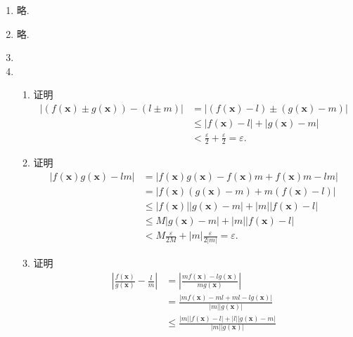 \documentclass[a4paper, 11pt]{ctexart}
\begin{document}
    \begin{enumerate}
        \item %
            略.
        \item %
            略.
        \item %
        \item %
            \begin{enumerate}[(1)]
                \item %
                    {\heiti 证明}\quad \begin{align*}
                        |(f(\boldsymbol{x}) \pm g(\boldsymbol{x})) - (l \pm m)| &= |(f(\boldsymbol{x}) - l) \pm (g(\boldsymbol{x}) - m)| \\
                        &\leqslant |f(\boldsymbol{x}) - l| + |g(\boldsymbol{x}) - m| \\
                        &< \frac{\varepsilon}{2} + \frac{\varepsilon}{2} = \varepsilon.
                    \end{align*}
                \item %
                    {\heiti 证明}\quad \begin{align*}
                        |f(\boldsymbol{x})g(\boldsymbol{x}) - lm| &= |f(\boldsymbol{x})g(\boldsymbol{x}) - f(\boldsymbol{x})m + f(\boldsymbol{x})m - lm| \\
                        &= |f(\boldsymbol{x})(g(\boldsymbol{x}) - m) + m(f(\boldsymbol{x}) - l)| \\
                        &\leqslant |f(\boldsymbol{x})||g(\boldsymbol{x}) - m| + |m||f(\boldsymbol{x}) - l| \\
                        &\leqslant M|g(\boldsymbol{x}) - m| + |m||f(\boldsymbol{x}) - l| \\
                        &< M\frac{\varepsilon}{2M} + |m|\frac{\varepsilon}{2|m|} = \varepsilon.
                    \end{align*}
                \item %
                    {\heiti 证明}\quad 
                    \begin{align*}
                        \left| \frac{f(\boldsymbol{x})}{g(\boldsymbol{x})} - \frac{l}{m} \right| &= \left| \frac{mf(\boldsymbol{x}) - lg(\boldsymbol{x})}{mg(\boldsymbol{x})} \right| \\
                        &= \frac{|mf(\boldsymbol{x}) - ml + ml - lg(\boldsymbol{x})|}{|m||g(\boldsymbol{x})|} \\
                        &\leqslant \frac{|m||f(\boldsymbol{x}) - l| + |l||g(\boldsymbol{x}) - m|}{|m||g(\boldsymbol{x})|} \\

\end{align*}
\end{enumerate}
\end{enumerate}
\end{document}
